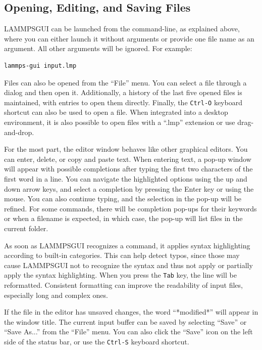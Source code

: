 \documentclass[9pt,tutorial]{livecoms}
\newcommand{\lammpsgui}{\textsf{LAMMPS\textendash GUI}}
\begin{document}
\begin{appendices}
\subsection{Opening, Editing, and Saving Files}

\lammpsgui{} can be launched from the command-line, as explained above, where you
can either launch it without arguments or provide one file name as an argument.  All
other arguments will be ignored.  For example:
\begin{lstlisting}[language=tcl]
lammps-gui input.lmp
\end{lstlisting}
Files can also be opened from the ``File'' menu.  You can select a
file through a dialog and then open it.  Additionally, a history of
the last five opened files is maintained, with entries to open them directly.
Finally, the \texttt{Ctrl-O} keyboard shortcut can also be used to open a file.
When integrated into a desktop environment, it is also possible to open
files with a ``.lmp'' extension or use drag-and-drop.

For the most part, the editor window behaves like other graphical
editors.  You can enter, delete, or copy and paste text.   When entering
text, a pop-up window will appear with possible completions after typing
the first two characters of the first word in a line.  You can
navigate the highlighted options using the up and down arrow keys, and select a
completion by pressing the Enter key or using the mouse.  You can also continue
typing, and the selection in the pop-up will be refined.  For some
commands, there will be completion pop-ups for their
keywords or when a filename is expected, in which case,
the pop-up will list files in the current folder.

As soon as \lammpsgui{} recognizes a command, it applies syntax
highlighting according to built-in categories.  This can help
detect typos, since those may cause \lammpsgui{} not to
recognize the syntax and thus not apply or partially apply
the syntax highlighting.  When you press the \texttt{Tab} key, the line will be
reformatted.  Consistent formatting can improve the readability of
input files, especially long and complex ones.

If the file in the editor has unsaved changes, the word
``*modified*'' will appear in the window title.  The current input
buffer can be saved by selecting ``Save'' or ``Save As...'' from the
``File'' menu.  You can also click the ``Save'' icon on the left side
of the status bar, or use the \texttt{Ctrl-S} keyboard shortcut.


\end{appendices}
\end{document}
